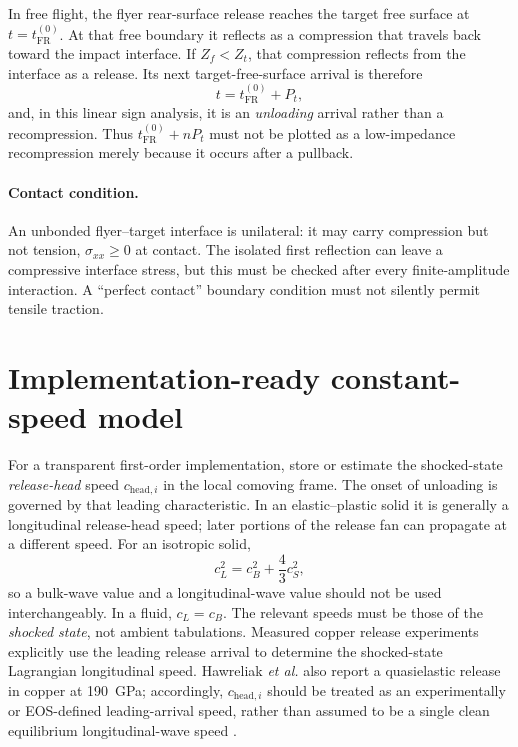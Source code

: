 \documentclass[11pt]{article}
\newcommand{\sig}{\sigma}
\newcommand{\tFR}{t_{\mathrm{FR}}^{(0)}}
\newcommand{\Pt}{P_t}
\begin{document}
In free flight, the flyer rear-surface release reaches the target free surface
at $t=\tFR$.  At that free boundary it reflects as a compression that
travels back toward the impact interface.  If $Z_f<Z_t$, that compression
reflects from the interface as a release.  Its next target-free-surface
arrival is therefore
\begin{equation}
  t=\tFR+\Pt,
  \label{eq:flyer-release-return}
\end{equation}
and, in this linear sign analysis, it is an \emph{unloading} arrival rather
than a recompression.  Thus $\tFR+n\Pt$ must not be plotted as a
low-impedance recompression merely because it occurs after a pullback.

\paragraph{Contact condition.} An unbonded flyer--target interface is
unilateral: it may carry compression but not tension, $\sig_{xx}\geq0$ at
contact.  The isolated first reflection can leave a compressive interface
stress, but this must be checked after every finite-amplitude interaction.  A
``perfect contact'' boundary condition must not silently permit tensile
traction.

\section{Implementation-ready constant-speed model}

For a transparent first-order implementation, store or estimate the
shocked-state \emph{release-head} speed $c_{\mathrm{head},i}$ in the local
comoving frame.  The onset of unloading is governed by that leading
characteristic.  In an elastic--plastic solid it is generally a longitudinal
release-head speed; later portions of the release fan can propagate at a
different speed.  For an isotropic solid,
\begin{equation}
  c_L^2=c_B^2+\frac{4}{3}c_S^2,
  \label{eq:longitudinal-bulk-shear}
\end{equation}
so a bulk-wave value and a longitudinal-wave value should not be used
interchangeably.  In a fluid, $c_L=c_B$.  The relevant speeds must be those of
the \emph{shocked state}, not ambient tabulations.  Measured copper release
experiments explicitly use the leading release arrival to determine the
shocked-state Lagrangian longitudinal speed.  Hawreliak \emph{et al.} also
report a quasielastic release in copper at 190~GPa; accordingly,
$c_{\mathrm{head},i}$ should be treated as an experimentally or
EOS-defined leading-arrival speed, rather than assumed to be a single clean
equilibrium longitudinal-wave speed \cite{Hawreliak2024}.
\end{document}
